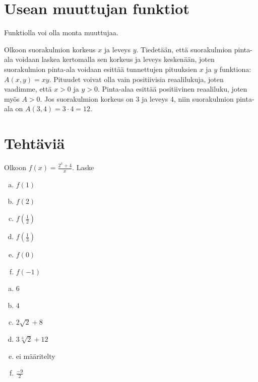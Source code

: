 \section{Usean muuttujan funktiot}

Funktiolla voi olla monta muuttujaa. 


\begin{esimerkki}
Olkoon suorakulmion korkeus $x$ ja leveys $y$. Tiedetään, että suorakulmion pinta-ala voidaan laskea kertomalla sen korkeus ja leveys keskenään, joten suorakulmion pinta-ala voidaan esittää tunnettujen pituuksien $x$ ja $y$ funktiona: $A(x, y)=xy$. Pituudet voivat olla vain positiivisia reaalilukuja, joten vaadimme, että $x>0$ ja $y>0$. Pinta-alaa esittää positiivinen reaaliluku, joten myös $A>0$. Jos suorakulmion korkeus on 3 ja leveys 4, niin suorakulmion pinta-ala on $A(3, 4)=3\cdot 4=12$.
\end{esimerkki}

\section*{Tehtäviä}
\begin{tehtava}
Olkoon $f(x)=\frac{2^x+4}{x}$. Laske
\begin{enumerate}[a)]
\item $f(1)$
\item $f(2)$
\item $f(\frac{1}{2})$
\item $f(\frac{1}{3})$
\item $f(0)$
\item $f(-1)$
\end{enumerate}
\begin{vastaus}
\begin{enumerate}[a)]
\item $6$
\item $4$
\item $2\sqrt{2}+8$
\item $3\sqrt[3]{2}+12$
\item ei määritelty
\item $\frac{-9}{2}$
\end{enumerate}
\end{vastaus}
\end{tehtava}

